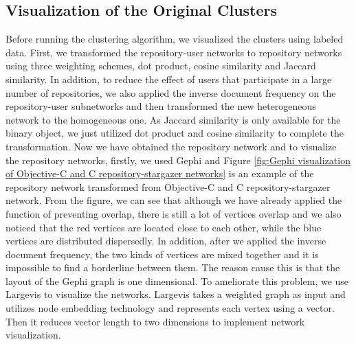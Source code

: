 \documentclass[12pt,oneside,final]{vlsithesis}
\begin{document}
 \subsection{Visualization of the Original Clusters}
Before running the clustering algorithm, we visualized the clusters using labeled data. First, we transformed the repository-user networks to repository networks using three weighting schemes, dot product, cosine similarity and Jaccard similarity. In addition, to reduce the effect of users that participate in a large number of repositories, we also applied the inverse document frequency on the repository-user subnetworks and then transformed the new heterogeneous network to the homogeneous one. As Jaccard similarity is only available for the binary object, we just utilized dot product and cosine similarity to complete the transformation. Now we have obtained the repository network and to visualize the repository networks, firstly, we used Gephi \cite{bastian2009gephi} and Figure \ref{fig:Gephi visualization of Objective-C and C repository-stargazer networks} is an example of the repository network transformed from Objective-C and C repository-stargazer network. From the figure, we can see that although we have already applied the function of preventing overlap, there is still a lot of vertices overlap and we also noticed that the red vertices are located close to each other, while the blue vertices are distributed dispersedly. In addition, after we applied the inverse document frequency, the two kinds of vertices are mixed together and it is impossible to find a borderline between them. The reason cause this is that the layout of the Gephi graph is one dimensional. To ameliorate this problem, we use Largevis\cite{tang2016visualizing} to visualize the networks. Largevis takes a weighted graph as input and utilizes node embedding technology and represents each vertex using a vector. Then it reduces vector length to two dimensions to implement network visualization.
\begin{figure*}
	\centering
	\caption{Gephi visualization of Objective-C and C repository-stargazer networks}
	\label{fig:Gephi visualization of Objective-C and C repository-stargazer networks}
\end{figure*}
\end{document}
